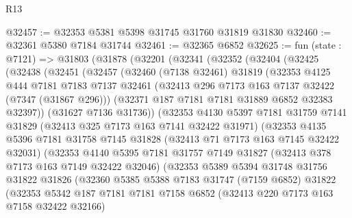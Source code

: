 \begin{lexlean}{R13}
\begin{coremodule}
@32457 := @32353 @5381 @5398 @31745 @31760 @31819 @31830
@32460 := @32361 @5380 @7184 @31744
@32461 := @32365 @6852
@32625 := fun (state : @7121) =>
  @31803
    (@31878
      (@32201
        (@32341
          (@32352
            (@32404
              (@32425
                (@32438
                  (@32451
                    (@32457
                      (@32460
                        (@7138 @32461)
                        @31819
                        (@32353
                          @4125
                          @444
                          @7181
                          @7183
                          @7137
                          @32461
                          (@32413 @296 @7173 @163 @7137 @32422 (@7347 (@31867 @296)))
                          (@32371 @187 @7181 @7181 @31889 @6852 @32383 @32397))
                        (@31627 @7136 @31736))
                      (@32353
                        @4130
                        @5397
                        @7181
                        @31759
                        @7141
                        @31829
                        (@32413 @325 @7173 @163 @7141 @32422 @31971)
                        (@32353
                          @4135
                          @5396
                          @7181
                          @31758
                          @7145
                          @31828
                          (@32413 @71 @7173 @163 @7145 @32422 @32031)
                          (@32353
                            @4140
                            @5395
                            @7181
                            @31757
                            @7149
                            @31827
                            (@32413 @378 @7173 @163 @7149 @32422 @32046)
                            (@32353
                              @5389
                              @5394
                              @31748
                              @31756
                              @31822
                              @31826
                              (@32360
                                @5385
                                @5388
                                @7183
                                @31747
                                (@7159 @6852)
                                @31822
                                (@32353
                                  @5342
                                  @187
                                  @7181
                                  @7181
                                  @7158
                                  @6852
                                  (@32413 @220 @7173 @163 @7158 @32422 @32166)

\end{coremodule}
\end{lexlean}
